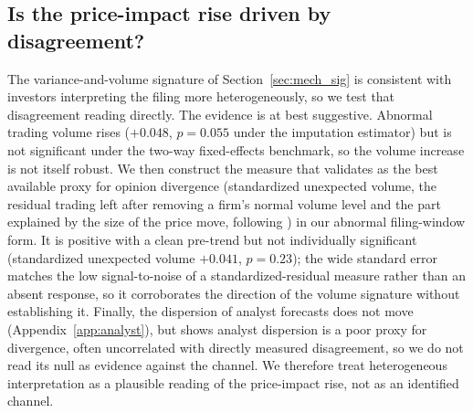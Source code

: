 \documentclass[12pt]{article}
\begin{document}
\subsection{Is the price-impact rise driven by disagreement?}\label{app:disagree}
The variance-and-volume signature of Section~\ref{sec:mech_sig} is consistent with investors interpreting the filing more heterogeneously, so we test that disagreement reading directly. The evidence is at best suggestive. Abnormal trading volume rises ($+0.048$, $p=0.055$ under the imputation estimator) but is not significant under the two-way fixed-effects benchmark, so the volume increase is not itself robust. We then construct the measure that \citet{Garfinkel2009} validates as the best available proxy for opinion divergence (standardized unexpected volume, the residual trading left after removing a firm's normal volume level and the part explained by the size of the price move, following \citet{GarfinkelSokobin2006}) in our abnormal filing-window form. It is positive with a clean pre-trend but not individually significant (standardized unexpected volume $+0.041$, $p=0.23$); the wide standard error matches the low signal-to-noise of a standardized-residual measure rather than an absent response, so it corroborates the direction of the volume signature without establishing it. Finally, the dispersion of analyst forecasts does not move (Appendix~\ref{app:analyst}), but \citet{Garfinkel2009} shows analyst dispersion is a poor proxy for divergence, often uncorrelated with directly measured disagreement, so we do not read its null as evidence against the channel. We therefore treat heterogeneous interpretation as a plausible reading of the price-impact rise, not as an identified channel.
\end{document}

